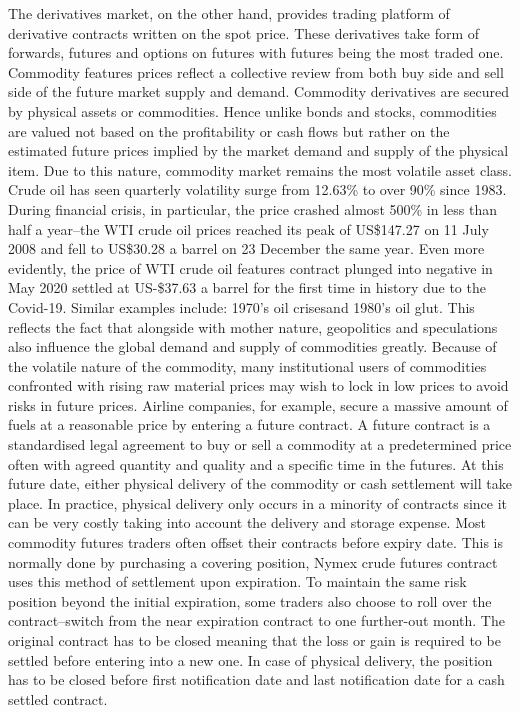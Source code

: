The derivatives market, on the other hand, provides trading platform of derivative contracts written on the spot price. These derivatives take form of forwards, futures and options on futures with futures being the most traded one. Commodity features prices reflect a collective review from both buy side and sell side of the future market supply and demand. Commodity derivatives are secured by physical assets or commodities. Hence unlike bonds and stocks, commodities are valued not based on the profitability or cash flows but rather on the estimated future prices implied by the market demand and supply of the physical item. Due to this nature, commodity market remains the most volatile asset class. Crude oil has seen quarterly volatility surge from 12.63\% to over 90\% since 1983. During financial crisis, in particular, the price crashed almost 500\% in less than half a year--the WTI crude oil prices reached its peak of US\$147.27 on 11 July 2008 and fell to US\$30.28 a barrel on 23 December the same year. Even more evidently, the price of WTI crude oil features contract plunged into negative in May 2020 settled at US-\$37.63 a barrel for the first time in history due to the Covid-19. Similar examples include: 1970's oil crises\parencite{olicrises}and 1980's oil glut\parencite{oliglut}. This reflects the fact that alongside with mother nature, geopolitics and speculations also influence the global demand and supply of commodities greatly. Because of the volatile nature of the commodity, many institutional users of commodities confronted with rising raw material prices may wish to lock in low prices to avoid risks in future prices. Airline companies, for example, secure a massive amount of fuels at a reasonable price by entering a future contract.  A future contract is a standardised legal agreement to buy or sell a commodity at a predetermined price often with agreed quantity and quality and a specific time in the futures. At this future date, either physical delivery of the commodity or cash settlement will take place. In practice, physical delivery only occurs in a minority of contracts since it can be very costly taking into account the delivery and storage expense. Most commodity futures traders often offset their contracts before expiry date. This is normally done by purchasing a covering position, Nymex crude futures contract uses this method of settlement upon expiration. To maintain the same risk position beyond the initial expiration, some traders also choose to roll over the contract--switch from the near expiration contract to one further-out month. The original contract has to be closed meaning that the loss or gain is required to be settled before entering into a new one. In case of physical delivery, the position has to be closed before first notification date and last notification date for a cash settled contract. 

